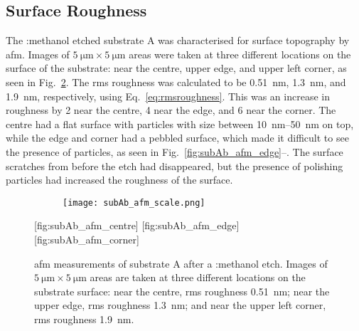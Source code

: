 \subsection{Surface Roughness}

The :methanol etched substrate A was characterised for surface topography by \ac{afm}. Images of $\SI{5}{\micro\metre}\times\SI{5}{\micro\metre}$ areas were taken at three different locations on the surface of the substrate: near the centre, upper edge, and upper left corner, as seen in Fig.~\ref{fig:subAb_afm}. The \ac{rms} roughness was calculated to be \SI{0.51}{\nano\metre}, \SI{1.3}{\nano\metre}, and \SI{1.9}{\nano\metre}, respectively, using Eq.~\ref{eq:rmsroughness}. This was an increase in roughness by 2 near the centre, 4 near the edge, and 6 near the corner. The centre had a flat surface with particles with size between \SIrange{10}{50}{\nano\metre} on top, while the edge and corner had a pebbled surface, which made it difficult to see the presence of particles, as seen in Fig.~\ref{fig:subAb_afm_edge}--. The surface scratches from before the etch had disappeared, but the presence of polishing particles had increased the roughness of the surface.

\begin{figure}[htbp]
    \centering
    \begin{subfigure}[c]{0.032\linewidth}
        \label{fig:subAb_afm_scale}\captionsetup{list=no}
        \texttt{[image: subAb\_afm\_scale.png]}
    \end{subfigure}
    \hfill
    [fig:subAb_afm_centre] %
    \hfill
    [fig:subAb_afm_edge] %
    \hfill
    [fig:subAb_afm_corner]%
    \caption[\Ac{afm} of substrate A after a :methanol etch.]{\Ac{afm} measurements of substrate A after a :methanol etch. Images of $\SI{5}{\micro\metre}\times\SI{5}{\micro\metre}$ areas are taken at three different locations on the substrate surface:  near the centre, \ac{rms} roughness \SI{0.51}{\nano\metre};  near the upper edge, \ac{rms} roughness \SI{1.3}{\nano\metre}; and  near the upper left corner, \ac{rms} roughness \SI{1.9}{\nano\metre}.}\label{fig:subAb_afm}
\end{figure} %

